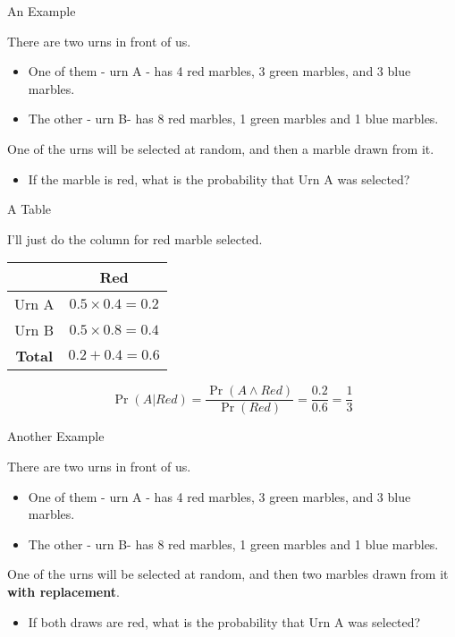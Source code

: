 \documentclass[
  ignorenonframetext,
]{beamer}
\providecommand{\tightlist}{%
  \setlength{\itemsep}{0pt}\setlength{\parskip}{0pt}}
\renewcommand{\,}{\text{, }}
\begin{document}
\begin{frame}{An Example}
\protect\hypertarget{an-example}{}

There are two urns in front of us.

\begin{itemize}
\tightlist
\item
  One of them - urn A - has 4 red marbles, 3 green marbles, and 3 blue
  marbles.
\item
  The other - urn B- has 8 red marbles, 1 green marbles and 1 blue
  marbles. \pause
\end{itemize}

One of the urns will be selected at random, and then a marble drawn from
it.

\begin{itemize}
\tightlist
\item
  If the marble is red, what is the probability that Urn A was selected?
\end{itemize}

\end{frame}

\begin{frame}{A Table}
\protect\hypertarget{a-table}{}

I'll just do the column for red marble selected.

\begin{longtable}[]{@{}cc@{}}
\toprule
& Red\tabularnewline
\midrule
\endhead
Urn A & \(0.5 \times 0.4 = 0.2\)\tabularnewline
Urn B & \(0.5 \times 0.8 = 0.4\)\tabularnewline
\textbf{Total} & \(0.2 + 0.4 = 0.6\)\tabularnewline
\bottomrule
\end{longtable}

\pause

\[
\Pr(A | Red) = \frac{\Pr(A \wedge Red)}{\Pr(Red)} = \frac{0.2}{0.6} = \frac{1}{3}
\]

\end{frame}

\begin{frame}{Another Example}
\protect\hypertarget{another-example}{}

There are two urns in front of us.

\begin{itemize}
\tightlist
\item
  One of them - urn A - has 4 red marbles, 3 green marbles, and 3 blue
  marbles.
\item
  The other - urn B- has 8 red marbles, 1 green marbles and 1 blue
  marbles. \pause
\end{itemize}

One of the urns will be selected at random, and then two marbles drawn
from it \textbf{with replacement}.

\begin{itemize}
\tightlist
\item
  If both draws are red, what is the probability that Urn A was
  selected?
\end{itemize}

\end{frame}
\end{document}
